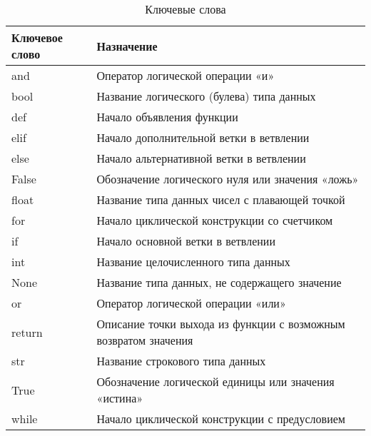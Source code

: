 \begin{table}[h]
    \centering
    \caption{Ключевые слова}
    \label{tab:python_keywords}
    \begin{tabular}{>{\ttfamily}l p{11cm}}
        \toprule
        \textrm{\normalfont Ключевое слово} & \textrm{\normalfont Назначение}                                 \\
        \midrule
        and                                 & Оператор логической операции «и»                                \\
        bool                                & Название логического (булева) типа данных                       \\
        def                                 & Начало объявления функции                                       \\
        elif                                & Начало дополнительной ветки в ветвлении                         \\
        else                                & Начало альтернативной ветки в ветвлении                         \\
        False                               & Обозначение логического нуля или значения «ложь»                \\
        float                               & Название типа данных чисел с плавающей точкой                   \\
        for                                 & Начало циклической конструкции со счетчиком                     \\
        if                                  & Начало основной ветки в ветвлении                               \\
        int                                 & Название целочисленного типа данных                             \\
        None                                & Название типа данных, не содержащего значение                   \\
        or                                  & Оператор логической операции «или»                              \\
        return                              & Описание точки выхода из функции с возможным возвратом значения \\
        str                                 & Название строкового типа данных                                 \\
        True                                & Обозначение логической единицы или значения «истина»            \\
        while                               & Начало циклической конструкции с предусловием                   \\
        \bottomrule
    \end{tabular}
\end{table}

